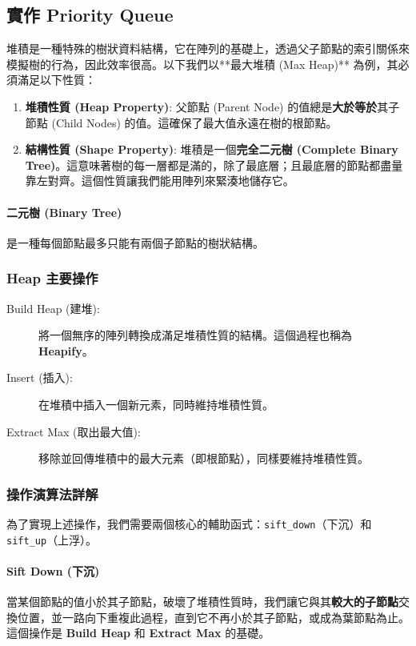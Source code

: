 \subsection{實作 Priority Queue}

堆積是一種特殊的樹狀資料結構，它在陣列的基礎上，透過父子節點的索引關係來模擬樹的行為，因此效率很高。以下我們以**最大堆積 (Max Heap)** 為例，其必須滿足以下性質：

\begin{enumerate}
    \item \textbf{堆積性質 (Heap Property)}: 父節點 (Parent Node) 的值總是\textbf{大於等於}其子節點 (Child Nodes) 的值。這確保了最大值永遠在樹的根節點。
    \item \textbf{結構性質 (Shape Property)}: 堆積是一個\textbf{完全二元樹 (Complete Binary Tree)}。這意味著樹的每一層都是滿的，除了最底層；且最底層的節點都盡量靠左對齊。這個性質讓我們能用陣列來緊湊地儲存它。
\end{enumerate}

\paragraph{二元樹 (Binary Tree)} 是一種每個節點最多只能有兩個子節點的樹狀結構。

\subsubsection{Heap 主要操作}
\begin{description}
    \item[Build Heap (建堆):] 將一個無序的陣列轉換成滿足堆積性質的結構。這個過程也稱為 \textbf{Heapify}。
    \item[Insert (插入):] 在堆積中插入一個新元素，同時維持堆積性質。
    \item[Extract Max (取出最大值):] 移除並回傳堆積中的最大元素（即根節點），同樣要維持堆積性質。
\end{description}

\subsubsection{操作演算法詳解}
為了實現上述操作，我們需要兩個核心的輔助函式：\verb|sift_down|（下沉）和 \verb|sift_up|（上浮）。

\paragraph{Sift Down (下沉)}
當某個節點的值小於其子節點，破壞了堆積性質時，我們讓它與其\textbf{較大的子節點}交換位置，並一路向下重複此過程，直到它不再小於其子節點，或成為葉節點為止。這個操作是 \textbf{Build Heap} 和 \textbf{Extract Max} 的基礎。

